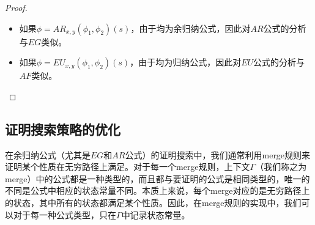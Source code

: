 \begin{proof}
\begin{itemize}
\begin{itemize}
\begin{itemize}
				$\textsf{cpt}(\Gamma\vdash EG_x(\psi)(s), c_1, c_2) \rsa^*\\
				\textsf{cpt}(\vdash(s/x)\psi,
				\textsf{cpt}(\Gamma'\vdash EG_x(\psi)(s_1), c_1,\\
				\textsf{cpt}(...\textsf{cpt}( \Gamma'\vdash EG_x(\psi)(s_n), c_1, c_2)...)),\\
				c_2)\rsa^*\\
				\textsf{cpt}(\Gamma'\vdash EG_x(\psi)(s_1), c_1,
				\textsf{cpt}(...\textsf{cpt}(\Gamma'\vdash EG_x(\psi)(s_n), c_1, c_2)...))\rsa^*\\
				\ldots\rsa^*\\
				\textsf{cpt}(\Gamma'\vdash EG_x(\psi)(s_i), c_1,
				\textsf{cpt}(...\textsf{cpt}(\Gamma'\vdash EG_x(\psi)(s_n), c_1, c_2)...))\rsa^*c_1$。
			\end{itemize}
		\end{itemize}
		
		\item 如果$\phi = AR_{x,y}(\phi_1,\phi_2)(s)$，由于均为余归纳公式，因此对$AR$公式的分析与$EG$类似。
		\item 如果$\phi = EU_{x,y}(\phi_1,\phi_2)(s)$，由于均为归纳公式，因此对$EU$公式的分析与$AF$类似。
	\end{itemize}
	
\end{proof}

\subsection{证明搜索策略的优化}\label{subsec:proofsearch:optimize}
在余归纳公式（尤其是$EG$和$AR$公式）的证明搜索中，我们通常利用merge规则来证明某个性质在无穷路径上满足。对于每一个merge规则，上下文$\Gamma$（我们称之为merge）中的公式都是一种类型的，而且都与要证明的公式是相同类型的，唯一的不同是公式中相应的状态常量不同。本质上来说，每个merge对应的是无穷路径上的状态，其中所有的状态都满足某个性质。因此，在merge规则的实现中，我们可以对于每一种公式类型，只在$\Gamma$中记录状态常量。

